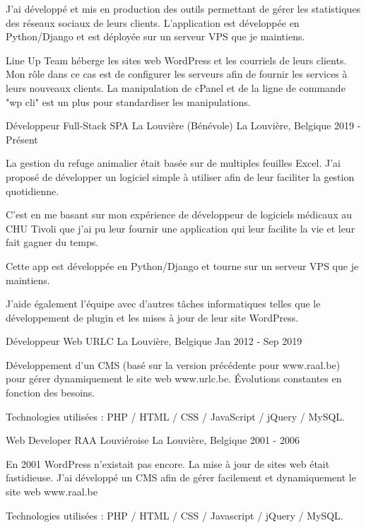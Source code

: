 \begin{cventries}
{    J'ai développé et mis en production des outils permettant de gérer les statistiques des réseaux sociaux de leurs clients. L'application est développée en Python/Django et est déployée sur un serveur VPS que je maintiens.
    
    Line Up Team héberge les sites web WordPress et les courriels de leurs clients. Mon rôle dans ce cas est de configurer les serveurs afin de fournir les services à leurs nouveaux clients. La manipulation de cPanel et de la ligne de commande "wp cli" est un plus pour standardiser les manipulations.

    }
    
    
  \cventry
    {Développeur Full-Stack} %
    {SPA La Louvière (Bénévole)} %
    {La Louvière, Belgique} %
    {2019 - Présent} %
    {
    La gestion du refuge animalier était basée sur de multiples feuilles Excel. J'ai proposé de développer un logiciel simple à utiliser afin de leur faciliter la gestion quotidienne.

    C'est en me basant sur mon expérience de développeur de logiciels médicaux au CHU Tivoli que j'ai pu leur fournir une application qui leur facilite la vie et leur fait gagner du temps.
    
    Cette app est développée en Python/Django et tourne sur un serveur VPS que je maintiens. 
    
    J'aide également l'équipe avec d'autres tâches informatiques telles que le développement de plugin et les mises à jour de leur site WordPress.

    }

  \cventry
    {Développeur Web} %
    {URLC} %
    {La Louvière, Belgique} %
    {Jan 2012 - Sep 2019} %
    {
    Développement d'un CMS (basé sur la version précédente pour www.raal.be) pour gérer dynamiquement le site web www.urlc.be.
    Évolutions constantes en fonction des besoins.

    Technologies utilisées : PHP / HTML / CSS / JavaScript / jQuery / MySQL.

    }

  \cventry
    {Web Developer} %
    {RAA Louviéroise} %
    {La Louvière, Belgique} %
    {2001 - 2006} %
    {
    En 2001 WordPress n'existait pas encore. La mise à jour de sites web était fastidieuse. J'ai développé un CMS afin de gérer facilement et dynamiquement le site web www.raal.be

Technologies utilisées : PHP / HTML / CSS / Javascript / jQuery / MySQL.

    }
\end{cventries}
